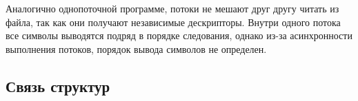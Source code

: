 Аналогично однопоточной программе, потоки не мешают друг другу читать из файла,
так как они получают независимые дескрипторы. Внутри одного потока все символы
выводятся подряд в порядке следования, однако из-за асинхронности выполнения
потоков, порядок вывода символов не определен.

\subsection{Связь структур}

\vspace*{\fill}
\begin{figure}[h]
    \centering
    \def\svgwidth{\textwidth}
    
\end{figure}
\vfill

